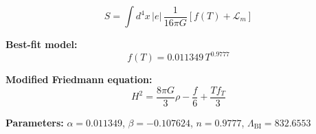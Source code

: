 
\begin{equation}
  S = \int d^4x \, |e| \, \frac{1}{16\pi G} \left[ f(T) + \mathcal{L}_m \right]
\end{equation}

\textbf{Best-fit model:}
\begin{equation}
  f(T) = 0.011349 \, T^{0.9777}
\end{equation}

\textbf{Modified Friedmann equation:}
\begin{equation}
  H^2 = \frac{8\pi G}{3} \rho - \frac{f}{6} + \frac{T f_T}{3}
\end{equation}

\textbf{Parameters:}
$\alpha = 0.011349$, \quad
$\beta = -0.107624$, \quad
$n = 0.9777$, \quad
$\Lambda_{\text{BI}} = 832.6553$